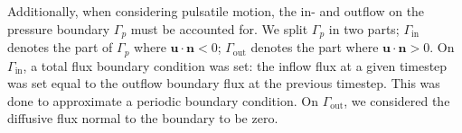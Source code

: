 \documentclass[fleqn]{wlscirep}
\newcommand{\Gp}{\Gamma_{p}}
\newcommand{\Ginj}{\Gamma_{\mathrm{inj}}}
\newcommand{\Gin}{\Gamma_{\mathrm{in}}}
\newcommand{\Gout}{\Gamma_{\mathrm{out}}}
\newcommand{\nn}{\mathbf{n}}
\newcommand{\uu}{\mathbf{u}}
\newcommand{\lyng}[1]{\textcolor{blue}{#1}}
\begin{document}
Additionally, when considering pulsatile motion, the in- and outflow on the pressure boundary $\Gp$ must be accounted for. We split $\Gp$ in two parts; $\Gin$ denotes the part of $\Gp$ where $\uu\cdot\nn < 0$; $\Gout$ denotes the part where $\uu\cdot\nn > 0$. On $\Gin$, a total flux boundary condition was set: the inflow flux at a given timestep was set equal to the outflow boundary flux at the previous timestep. This was done to approximate a periodic boundary condition. On $\Gout$, we considered the diffusive flux normal to the boundary to be zero. 

\end{document}
